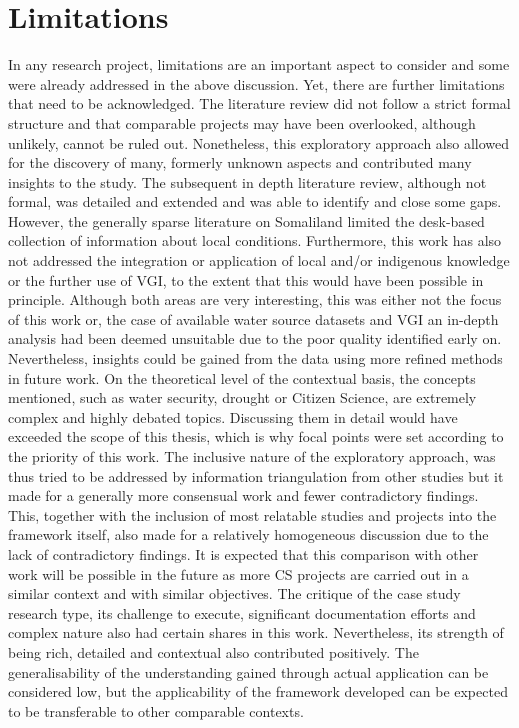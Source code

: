 \section{Limitations}
In any research project, limitations are an important aspect to consider and some were already addressed in the above discussion. Yet, there are further limitations that need to be acknowledged. The literature review did not follow a strict formal structure and that comparable projects may have been overlooked, although unlikely, cannot be ruled out. Nonetheless, this exploratory approach also allowed for the discovery of many, formerly unknown aspects and contributed many insights to the study. The subsequent in depth literature review, although not formal, was detailed and extended and was able to identify and close some gaps. However, the generally sparse literature on Somaliland limited the desk-based collection of information about local conditions. Furthermore, this work has also not addressed the integration or application of local and/or indigenous knowledge or the further use of VGI, to the extent that this would have been possible in principle. Although both areas are very interesting, this was either not the focus of this work or, the case of available water source datasets and VGI an in-depth analysis had been deemed unsuitable due to the poor quality identified early on. Nevertheless, insights could be gained from the data using more refined methods in future work. On the theoretical level of the contextual basis, the concepts mentioned, such as water security, drought or Citizen Science, are extremely complex and highly debated topics. Discussing them in detail would have exceeded the scope of this thesis, which is why focal points were set according to the priority of this work.\newline
The inclusive nature of the exploratory approach, was thus tried to be addressed by information triangulation from other studies but it made for a generally more consensual work and fewer contradictory findings. This, together with the inclusion of most relatable studies and projects into the framework itself, also made for a relatively homogeneous discussion due to the lack of contradictory findings. It is expected that this comparison with other work will be possible in the future as more CS projects are carried out in a similar context and with similar objectives.\newline
The critique of the case study research type, its challenge to execute, significant documentation efforts and complex nature also had certain shares in this work. Nevertheless, its strength of being rich, detailed and contextual also contributed positively. The generalisability of the understanding gained through actual application can be considered low, but the applicability of the framework developed can be expected to be transferable to other comparable contexts.\newline
